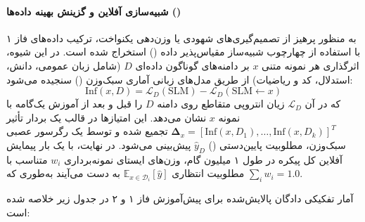 \paragraph*{شبیه‌سازی آفلاین و گزینش بهینه داده‌ها ()}
به منظور پرهیز از تصمیم‌گیری‌های شهودی یا وزن‌دهی یکنواخت، ترکیب داده‌های فاز ۱ با استفاده از چهارچوب شبیه‌ساز مقیاس‌پذیر داده () \cite{chang2025sdm, chang2025automixer} استخراج شده است. در این شیوه، اثرگذاری هر نمونه متنی $x$ بر دامنه‌های گوناگون داده‌ای $D$ (شامل زبان عمومی، دانش، استدلال، کد و ریاضیات) از طریق مدل‌های زبانی آماری سبک‌وزن () سنجیده می‌شود:
\begin{equation}
    \text{Inf}(x, D) = \mathcal{L}_D(\text{SLM}) - \mathcal{L}_D(\text{SLM} \leftarrow x)
\end{equation}
که در آن $\mathcal{L}_D$ زیان انتروپی متقاطع روی دامنه $D$ را قبل و بعد از آموزش یک‌گامه با نمونه $x$ نشان می‌دهد. این امتیازها در قالب یک بردار تأثیر $\mathbf{\Delta}_x = [\text{Inf}(x, D_1), \dots, \text{Inf}(x, D_k)]^T$ تجمیع شده و توسط یک رگرسور عصبی سبک‌وزن، مطلوبیت پایین‌دستی () $\hat{y}_D$ پیش‌بینی می‌شود. در نهایت، با یک بار پیمایش آفلاین کل پیکره در طول ۱ میلیون گام، وزن‌های ایستای نمونه‌برداری $w_i$ متناسب با مطلوبیت انتظاری $\mathbb{E}_{x \in \mathcal{D}_i}[\hat{y}]$ به دست می‌آیند به‌طوری که $\sum_i w_i = 1.0$.

آمار تفکیکی دادگان پالایش‌شده برای پیش‌آموزش فاز ۱ و ۲ در جدول زیر خلاصه شده است:

\begin{table}[htbp]
\centering
\caption{مشخصات آماری دادگان فاز ۱ و فاز ۲ پیش‌آموزش مدل }
\label{tab:mobilellm_pro_pretrain_data}
\end{table}

